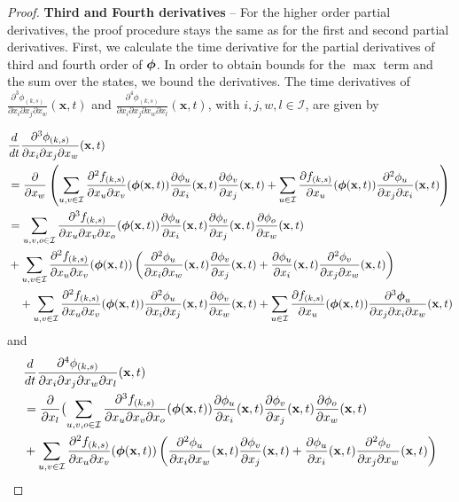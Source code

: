 \documentclass[acmsmall]{acmart}
\newcommand\bx{\mathbf{x}}
\newcommand\bphi{\text{\boldmath$\phi$}}
\newcommand\calI{\mathcal{I}}
\newcommand{\dddd}[5]{ \frac{\partial^4 #1 }{ \partial x_{#2} \partial x_{#3} \partial x_{#4} \partial x_{#5} }}
\newcommand{\ddd}[4]{ \frac{\partial^3 #1 }{ \partial x_{#2} \partial x_{#3} \partial x_{#4} }}
\newcommand{\dd}[3]{ \frac{\partial^2 #1 }{ \partial x_{#2} \partial x_{#3}}}
\begin{document}
\begin{proof}
\medskip

\color{myorange}
\textbf{Third and Fourth derivatives} -- For the higher order partial derivatives, the proof procedure stays the same as for the first and second partial derivatives. First, we calculate the time derivative for the partial derivatives of third and fourth order of $\bphi$. In order to obtain bounds for the $\max$ term and the sum over the states, we bound the derivatives. The time derivatives of $\ddd{\phi_{(k,s)}}{i}{j}{w}(\bx,t)$ and $\dddd{\phi_{(k,s)}}{i}{j}{w}{l}(\bx,t)$, with $i,j,w,l \in \calI$, are given by 

\begin{align*}
& \frac{d}{dt} \ddd{\phi_{(k,s)}}{i}{j}{w}(\bx,t) \\
& = \frac{\partial}{\partial x_w} \left( \sum_{u,v \in \calI} \dd{f_{(k,s)}}{u}{v}(\bphi (\bx,t)) \frac{\partial \phi_{u}}{\partial x_i}(\bx,t) \frac{\partial \phi_{v}}{\partial x_j}(\bx,t) + \sum_{u \in \calI} \frac{\partial f_{(k,s)}}{\partial x_u}(\bphi (\bx,t)) \dd{\phi_u}{j}{i}(\bx,t)  \right) \\
& = \sum_{u,v,o\in \calI} \ddd{f_{(k,s)}}{u}{v}{o}(\bphi (\bx,t)) \frac{\partial \phi_{u}}{\partial x_i}(\bx,t) \frac{\partial \phi_{v}}{\partial x_j}(\bx,t) \frac{\partial \phi_{o}}{\partial x_w}(\bx,t) \\
& + \sum_{u,v \in \calI} \dd{f_{(k,s)}}{u}{v}(\bphi (\bx,t)) \left(\dd{\phi_{u}}{i}{w}(\bx,t) \frac{\partial \phi_{v}}{\partial x_j}(\bx,t) + \frac{\partial \phi_{u}}{\partial x_i}(\bx,t) \dd{\phi_{v}}{j}{w}(\bx,t) \right) \\
& \quad + \sum_{u,v \in \calI} \dd{f_{(k,s)}}{u}{v}(\bphi (\bx,t)) \dd{\phi_{u}}{i}{j}(\bx,t) \frac{\partial \phi_{v}}{\partial x_w}(\bx,t) + \sum_{u \in \calI} \frac{\partial f_{(k,s)}}{\partial x_u}(\bphi (\bx,t)) \ddd{\bphi_{u}}{j}{i}{w}(\bx,t)
\end{align*}
and
\begin{align*}
& \frac{d}{dt} \dddd{\phi_{(k,s)}}{i}{j}{w}{l}(\bx,t) \\
& = \frac{\partial}{\partial x_l} \bigl( \sum_{u,v,o\in \calI} \ddd{f_{(k,s)}}{u}{v}{o}(\bphi (\bx,t)) \frac{\partial \phi_{u}}{\partial x_i}(\bx,t) \frac{\partial \phi_{v}}{\partial x_j}(\bx,t) \frac{\partial \phi_{o}}{\partial x_w}(\bx,t) \\
& + \sum_{u,v \in \calI} \dd{f_{(k,s)}}{u}{v}(\bphi (\bx,t)) \left(\dd{\phi_{u}}{i}{w}(\bx,t) \frac{\partial \phi_{v}}{\partial x_j}(\bx,t) + \frac{\partial \phi_{u}}{\partial x_i}(\bx,t) \dd{\phi_{v}}{j}{w}(\bx,t) \right) \\

\end{align*}
\end{proof}
\end{document}

